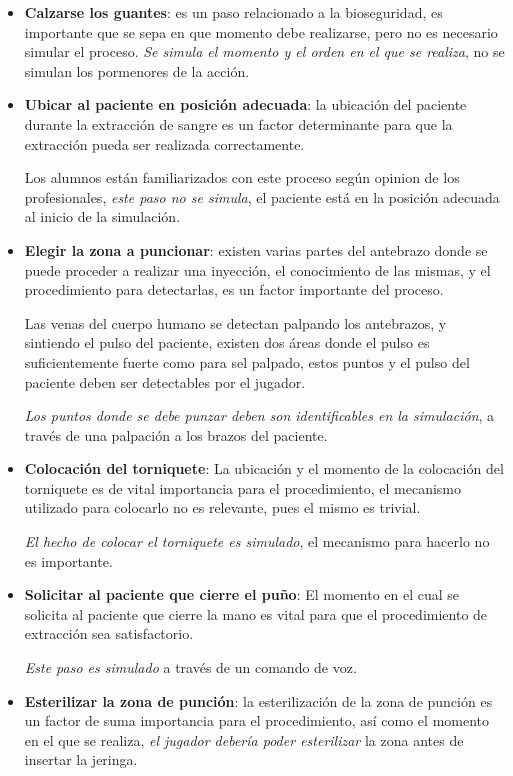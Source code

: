 \begin{itemize}
\item \textbf{Calzarse los guantes}: es un paso relacionado a la bioseguridad,
    es importante que se sepa en que momento debe realizarse, pero no es
    necesario simular el proceso. 
    \emph{Se simula el momento y el orden en el que se realiza}, no se simulan
    los pormenores de la acción.

\item \textbf{Ubicar al paciente en posición adecuada}: la ubicación del
    paciente durante la extracción de sangre es un factor determinante para que
    la extracción pueda ser realizada correctamente.

    Los alumnos están familiarizados con este proceso según opinion de los
    profesionales, \emph{este paso no se simula}, el paciente está en la
    posición adecuada al inicio de la simulación.

\item \textbf{Elegir la zona a puncionar}: existen varias partes del antebrazo
    donde se puede proceder a realizar una inyección, el conocimiento de las
    mismas, y el procedimiento para detectarlas, es un factor importante del
    proceso.
    
    Las venas del cuerpo humano se detectan palpando los antebrazos, y sintiendo
    el pulso del paciente, existen dos áreas donde el pulso es suficientemente
    fuerte como para sel palpado, estos puntos y el pulso del paciente deben ser
    detectables por el jugador.

    \emph{Los puntos donde se debe punzar deben son identificables en la
        simulación}, a través de una palpación a los brazos del paciente. 

\item \textbf{Colocación del torniquete}: La ubicación y el momento de la
    colocación del torniquete es de vital importancia para el procedimiento, el
    mecanismo utilizado para colocarlo no es relevante, pues el mismo es
    trivial.

    \emph{El hecho de colocar el torniquete es simulado}, el mecanismo para
    hacerlo no es importante.

\item \textbf{Solicitar al paciente que cierre el puño}: El momento en el cual
    se solicita al paciente que cierre la mano es vital para que el
    procedimiento de extracción sea satisfactorio.

    \emph{Este paso es simulado} a través de un comando de voz.

\item \textbf{Esterilizar la zona de punción}: la esterilización de la zona de
    punción es un factor de suma importancia para el procedimiento, así como el
    momento en el que se realiza, \emph{el jugador debería poder esterilizar} la
    zona antes de insertar la jeringa.
    

\end{itemize}
